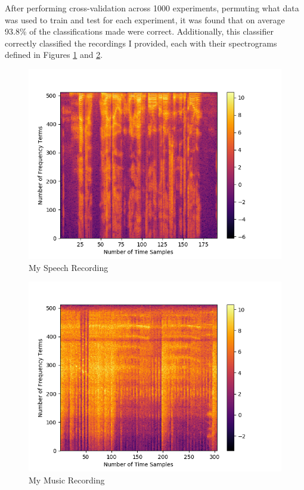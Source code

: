 \documentclass{article}[12pt]
\begin{document}
   After performing cross-validation across 1000 experiments, permuting what data was used to train and test for each experiment, it was found that on average 93.8\% of the classifications made were correct. Additionally, this classifier correctly classified the recordings I provided, each with their spectrograms defined in Figures \ref{fig:srec} and \ref{fig:mrec}. 
   
   \begin{figure}[ht]
   	\centerline{
   		\includegraphics[scale=0.5]{../scripts/p3/spectrogram_speech.png}}
   	\caption{My Speech Recording}
   	\label{fig:srec}
   \end{figure}

	\begin{figure}[ht]
		\centerline{
			\includegraphics[scale=0.5]{../scripts/p3/spectrogram_music.png}}
		\caption{My Music Recording}
		\label{fig:mrec}
	\end{figure}
\end{document}
